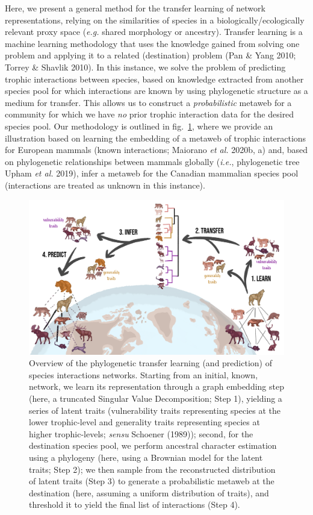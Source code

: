 \documentclass[11pt]{article}
\makeatletter
\def\maxwidth{\ifdim\Gin@nat@width>\linewidth\linewidth
\else\Gin@nat@width\fi}
\let\Oldincludegraphics\includegraphics
\renewcommand{\includegraphics}[1]{\Oldincludegraphics[width=\maxwidth]{#1}}
\makeatother
\begin{document}
Here, we present a general method for the transfer learning of network
representations, relying on the similarities of species in a
biologically/ecologically relevant proxy space (\emph{e.g.} shared
morphology or ancestry). Transfer learning is a machine learning
methodology that uses the knowledge gained from solving one problem and
applying it to a related (destination) problem (Pan \& Yang 2010; Torrey
\& Shavlik 2010). In this instance, we solve the problem of predicting
trophic interactions between species, based on knowledge extracted from
another species pool for which interactions are known by using
phylogenetic structure as a medium for transfer. This allows us to
construct a \emph{probabilistic} metaweb for a community for which we
have \emph{no} prior trophic interaction data for the desired species
pool. Our methodology is outlined in fig.~\ref{fig:concept}, where we
provide an illustration based on learning the embedding of a metaweb of
trophic interactions for European mammals (known interactions; Maiorano
\emph{et al.} 2020b, a) and, based on phylogenetic relationships between
mammals globally (\emph{i.e.}, phylogenetic tree Upham \emph{et al.}
2019), infer a metaweb for the Canadian mammalian species pool
(interactions are treated as unknown in this instance).

\begin{figure}
\hypertarget{fig:concept}{%
\centering
\includegraphics{figures/figure-concept.png}
\caption{Overview of the phylogenetic transfer learning (and prediction)
of species interactions networks. Starting from an initial, known,
network, we learn its representation through a graph embedding step
(here, a truncated Singular Value Decomposition; Step 1), yielding a
series of latent traits (vulnerability traits representing species at
the lower trophic-level and generality traits representing species at
higher trophic-levels; \emph{sensu} Schoener (1989)); second, for the
destination species pool, we perform ancestral character estimation
using a phylogeny (here, using a Brownian model for the latent traits;
Step 2); we then sample from the reconstructed distribution of latent
traits (Step 3) to generate a probabilistic metaweb at the destination
(here, assuming a uniform distribution of traits), and threshold it to
yield the final list of interactions (Step 4).}\label{fig:concept}
}
\end{figure}
\end{document}
